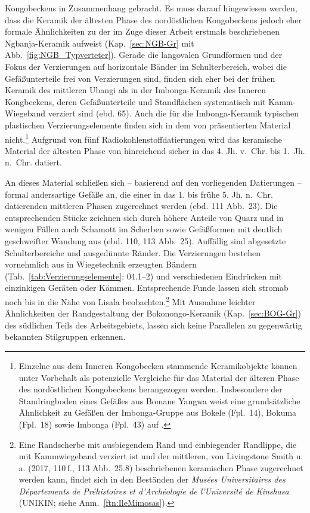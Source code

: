 Kongobeckens \parencite[59--68]{Wotzka.1995} in Zusammenhang gebracht. Es muss darauf hingewiesen werden, dass die Keramik der ältesten Phase des nordöstlichen Kongobeckens jedoch eher formale Ähnlichkeiten zu der im Zuge dieser Arbeit erstmals beschriebenen \mbox{Ngbanja}-Keramik aufweist (Kap.~\ref{sec:NGB-Gr} mit Abb.~\ref{fig:NGB_Typverteter}). Gerade die langovalen Grundformen und der Fokus der Verzierungen auf horizontale Bänder im Schulterbereich, wobei die Gefäßunterteile frei von Verzierungen sind, finden sich eher bei der frühen Keramik des mittleren \mbox{Ubangi} als in der Imbonga-Keramik des Inneren Kongbeckens, deren Gefäßunterteile und Standflächen systematisch mit Kamm-Wiegeband verziert sind (ebd. 65). Auch die für die Imbonga-Keramik typischen plastischen Verzierungselemente finden sich in dem von \textcite[112 Abb.~24]{LivingstoneSmith.2017} präsentierten Material nicht.\footnote{Einzelne aus dem Inneren Kongobecken stammende Keramikobjekte können unter Vorbehalt als potenzielle Vergleiche für das Material der älteren Phase des nordöstlichen Kongobeckens herangezogen werden. Insbesondere der Standringboden eines Gefäßes aus Bomane Yangwa \parencites[14 Abb.~3]{LivingstoneSmith.2011} weist eine grundsätzliche Ähnlichkeit zu Gefäßen der Imbonga-Gruppe aus Bokele (Fpl.~14), Bokuma (Fpl.~18) sowie Imbonga (Fpl.~43) auf \parencite[453 Taf.~19.4, 6, 9, 470 Taf.~36.12, 471 Taf.~37.7, 490 Taf.~56.2]{Wotzka.1995}.} Aufgrund von fünf Radiokohlenstoffdatierungen wird das keramische Material der ältesten Phase von \textcite[111 Abb.~23]{LivingstoneSmith.2017} hinreichend sicher in das 4. Jh. v.~Chr. bis 1.~Jh. n.~Chr. datiert.

An dieses Material schließen sich -- basierend auf den vorliegenden Datierungen -- formal andersartige Gefäße an, die einer in das 1. bis frühe 5. Jh. n.~Chr. datierenden mittleren Phasen zugerechnet werden (ebd. 111 Abb.~23). Die entsprechenden Stücke zeichnen sich durch höhere Anteile von Quarz und in wenigen Fällen auch Schamott im Scherben sowie Gefäßformen mit deutlich geschweifter Wandung aus (ebd. 110, 113 Abb.~25). Auffällig sind abgesetzte Schulterbereiche und ausgedünnte Ränder. Die Verzierungen bestehen vornehmlich aus in Wiegetechnik erzeugten Bändern (Tab.~\ref{tab:Verzierungselemente}: 04.1--2) und verschiedenen Eindrücken mit einzinkigen Geräten oder Kämmen. Entsprechende Funde lassen sich stromab noch bis in die Nähe von Lisala beobachten.\footnote{Eine Randscherbe mit ausbiegendem Rand und einbiegender Randlippe, die mit Kammwiegeband verziert ist und der mittleren, von Livingstone Smith u.\,a. (2017, 110\,f., 113 Abb.~25.8) beschriebenen keramischen Phase zugerechnet werden kann, findet sich in den Beständen der \textit{Musées Universitaires des Départements de Préhistoires et d'Archéologie de l'Université de Kinshasa} (UNIKIN; siehe Anm.~\ref{ftn:IleMimosas}).} Mit Ausnahme leichter Ähnlichkeiten der Randgestaltung der Bokonongo-Keramik (Kap.~\ref{sec:BOG-Gr}) des südlichen Teils des Arbeitsgebiets, lassen sich keine Parallelen zu gegenwärtig bekannten Stilgruppen erkennen.

